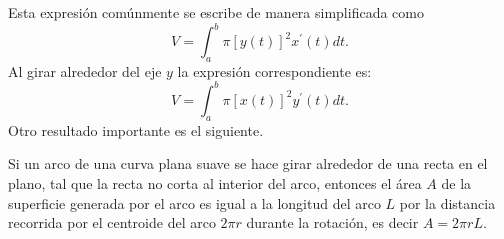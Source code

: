 Esta expresión comúnmente se escribe de manera simplificada como
\[V=\int_{a}^{b}\pi \left[ y\left( t\right) \right] ^{2}x^{\prime }(t) dt.\]
Al girar alrededor del eje $y$ la expresión correspondiente es:
\[V=\int_{a}^{b}\pi \left[ x\left( t\right) \right] ^{2}y^{\prime }(t) dt.\]
Otro resultado importante es el siguiente.

\begin{teorema} \label{teoremadepappus}
  Si un arco de una curva plana suave se hace girar alrededor de una recta
  en el plano, tal que la recta no corta al interior del arco, entonces el
  área $A$ de la superficie generada por el arco es igual a la longitud del arco $L$ por la
  distancia recorrida por el centroide del arco $2\pi r$ durante la rotación, es decir $A=2\pi rL$.
\end{teorema}


